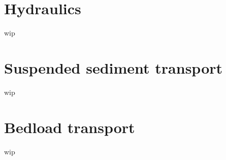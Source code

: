 \section{Hydraulics}

wip

\section{Suspended sediment transport}
wip

\section{Bedload transport}
wip

